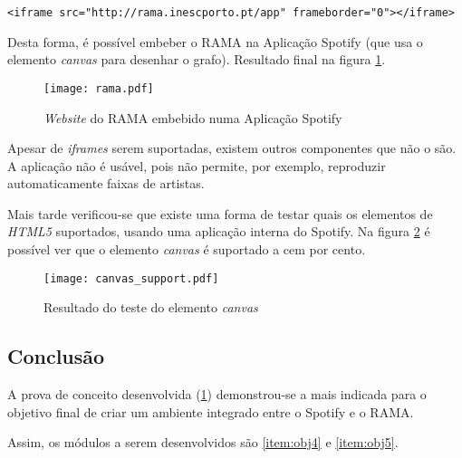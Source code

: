     \begin{lstlisting}[caption={Elemento \emph{iframe} que embebe o \emph{website} do RAMA na aplicação}]
      <iframe src="http://rama.inescporto.pt/app" frameborder="0"></iframe>\end{lstlisting}

    Desta forma, é possível embeber o RAMA na Aplicação Spotify (que usa o elemento \emph{canvas} para desenhar o grafo).
    Resultado final na figura \ref{fig:rama_spotifyed}.

    \begin{figure}
      \begin{center}
        \texttt{[image: rama.pdf]}
      \end{center}
      \caption{\emph{Website} do RAMA embebido numa Aplicação Spotify}
      \label{fig:rama_spotifyed}
    \end{figure}

    Apesar de \emph{iframes} serem suportadas, existem outros componentes que não o são.
    A aplicação não é usável, pois não permite, por exemplo, reproduzir automaticamente faixas de artistas.

    Mais tarde verificou-se que existe uma forma de testar quais os elementos de \emph{HTML5} suportados, usando uma aplicação interna do Spotify.
    Na figura \ref{fig:canvas_support} é possível ver que o elemento \emph{canvas} é suportado a cem por cento.

    \begin{figure}
       \begin{center}
         \texttt{[image: canvas\_support.pdf]}
       \end{center}
       \caption{Resultado do teste do elemento \emph{canvas}}
       \label{fig:canvas_support}
     \end{figure}


  \subsection{Conclusão} %
  \label{sub:conclusao}
  
    A prova de conceito desenvolvida (\ref{fig:rama_spotifyed}) demonstrou-se a mais indicada para o objetivo final de criar um ambiente integrado entre o Spotify e o RAMA.

    Assim, os módulos a serem desenvolvidos são \ref{item:obj4} e \ref{item:obj5}.

